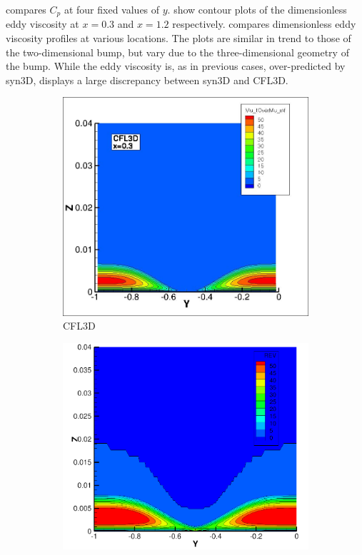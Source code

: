  compares $C_p$ at four fixed values of $y$.  show contour plots of the dimensionless eddy viscosity at $x=0.3$ and $x=1.2$ respectively.  compares dimensionless eddy viscosity profiles at various locations. The plots are similar in trend to those of the two-dimensional bump, but vary due to the three-dimensional geometry of the bump. While the eddy viscosity is, as in previous cases, over-predicted by syn3D,  displays a large discrepancy between syn3D and CFL3D.

\begin{figure}[ht!]
\centering
\begin{subfigure}{.45\textwidth}
  \centering
  \includegraphics[width=1.0\textwidth]{figs/3dbump/mut_03_cfl3d.jpg}
  \caption{CFL3D}
\end{subfigure}%
\begin{subfigure}{.45\textwidth}
  \centering
  \includegraphics[width=1.0\textwidth]{figs/3dbump/x03Rev.png}

\end{subfigure}
\end{figure}
